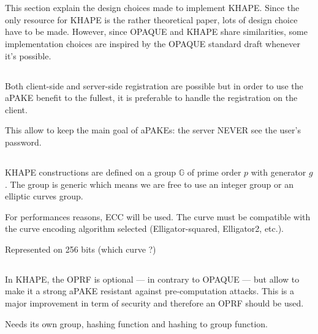 \documentclass[../report.tex]{subfiles}
\begin{document}
\section{}

This section explain the design choices made to implement KHAPE.
Since the only resource for KHAPE is the rather theoretical paper, lots of design choice have to be made. However, since OPAQUE and KHAPE share similarities, some implementation choices are inspired by the OPAQUE standard draft whenever it's possible.


\subsection{}
Both client-side and server-side registration are possible but in order to use the aPAKE benefit to the fullest, it is preferable to handle the registration on the client.

This allow to keep the main goal of aPAKEs: the server NEVER see the user's password.

\subsection{}


KHAPE constructions are defined on a group $\mathbb{G}$ of prime order $p$ with generator $g$.
The group is generic which means we are free to use an integer group or an elliptic curves group.

For performances reasons, ECC will be used.
The curve must be compatible with the curve encoding algorithm selected (Elligator-squared, Elligator2, etc.).

Represented on 256 bits (which curve ?)


\subsection{}
In KHAPE, the OPRF is optional --- in contrary to OPAQUE --- but allow to make it a strong aPAKE resistant against pre-computation attacks.
This is a major improvement in term of security and therefore an OPRF should be used.

Needs its own group, hashing function and hashing to group function.
\end{document}
